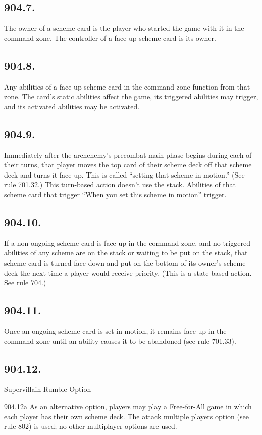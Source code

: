 \subsection*{904.7.}
The owner of a scheme card is the player who started the game with it in the command zone. The controller of a face-up scheme card is its owner.

\subsection*{904.8.}
Any abilities of a face-up scheme card in the command zone function from that zone. The card’s static abilities affect the game, its triggered abilities may trigger, and its activated abilities may be activated.

\subsection*{904.9.}
Immediately after the archenemy’s precombat main phase begins during each of their turns, that player moves the top card of their scheme deck off that scheme deck and turns it face up. This is called “setting that scheme in motion.” (See rule 701.32.) This turn-based action doesn’t use the stack. Abilities of that scheme card that trigger “When you set this scheme in motion” trigger.

\subsection*{904.10.}
If a non-ongoing scheme card is face up in the command zone, and no triggered abilities of any scheme are on the stack or waiting to be put on the stack, that scheme card is turned face down and put on the bottom of its owner’s scheme deck the next time a player would receive priority. (This is a state-based action. See rule 704.)

\subsection*{904.11.}
Once an ongoing scheme card is set in motion, it remains face up in the command zone until an ability causes it to be abandoned (see rule 701.33).

\subsection*{904.12.}
Supervillain Rumble Option

904.12a As an alternative option, players may play a Free-for-All game in which each player has their own scheme deck. The attack multiple players option (see rule 802) is used; no other multiplayer options are used.

